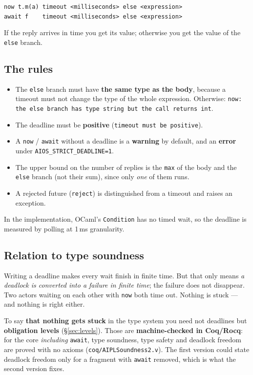 \documentclass[11pt,a4paper]{article}
\begin{document}
\begin{lstlisting}
now t.m(a) timeout <milliseconds> else <expression>
await f    timeout <milliseconds> else <expression>
\end{lstlisting}

If the reply arrives in time you get its value; otherwise you get the value of
the \texttt{else} branch.

\subsection{The rules}

\begin{itemize}
\item The \texttt{else} branch must have \textbf{the same type as the body},
  because a timeout must not change the type of the whole expression.
  Otherwise: \texttt{now: the else branch has type string but the call returns int}.
\item The deadline must be \textbf{positive} (\texttt{timeout must be positive}).
\item A \texttt{now} / \texttt{await} without a deadline is a \textbf{warning}
  by default, and an \textbf{error} under \texttt{AIOS\_STRICT\_DEADLINE=1}.
\item The upper bound on the number of replies is the \texttt{max} of the body
  and the \texttt{else} branch (not their sum), since only \emph{one} of them
  runs.
\item A rejected future (\texttt{reject}) is distinguished from a timeout and
  raises an exception.
\end{itemize}

In the implementation, OCaml's \texttt{Condition} has no timed wait, so the
deadline is measured by polling at 1\,ms granularity.

\subsection{Relation to type soundness}
\label{sec:soundness}

Writing a deadline makes every wait finish in finite time. But that only means
\emph{a deadlock is converted into a failure in finite time}; the failure does
not disappear. Two actors waiting on each other with \texttt{now} both time
out. Nothing is stuck --- and nothing is right either.

To say \textbf{that nothing gets stuck} in the type system you need not
deadlines but \textbf{obligation levels} (\S\ref{sec:levels}). Those are
\textbf{machine-checked in Coq/Rocq}: for the core \emph{including}
\texttt{await}, type soundness, type safety and deadlock freedom are proved
with no axioms (\texttt{coq/AIPLSoundness2.v}). The first version could state
deadlock freedom only for a fragment with \texttt{await} removed, which is what
the second version fixes.
\end{document}
